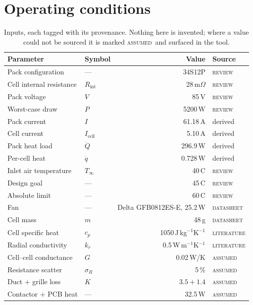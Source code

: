 \documentclass[11pt,a4paper]{article}
\newcommand{\qty}[2]{#1\,#2}
\newcommand{\REV}{\textcolor{ink}{\textsc{review}}}
\newcommand{\DAT}{\textcolor{ink}{\textsc{datasheet}}}
\newcommand{\LIT}{\textcolor{muted}{\textsc{literature}}}
\newcommand{\ASS}{\textcolor{warn}{\textsc{assumed}}}
\begin{document}
\section{Operating conditions}

\begin{table}[htbp]
\centering
\caption{Inputs, each tagged with its provenance. Nothing here is invented;
where a value could not be sourced it is marked \ASS\ and surfaced in the tool.}
\label{tab:inputs}
\small
{}
\begin{tabular}{llr l}
\toprule
\textbf{Parameter} & \textbf{Symbol} & \textbf{Value} & \textbf{Source} \\
\midrule
Pack configuration & --- & 34S12P & \REV \\
Cell internal resistance & $R_{\mathrm{int}}$ & \qty{28}{m$\Omega$} & \REV \\
Pack voltage & $V$ & \qty{85}{V} & \REV \\
Worst-case draw & $P$ & \qty{5200}{W} & \REV \\
Pack current & $I$ & \qty{61.18}{A} & derived \\
Cell current & $I_{\mathrm{cell}}$ & \qty{5.10}{A} & derived \\
Pack heat load & $\dot Q$ & \qty{296.9}{W} & derived \\
Per-cell heat & $\dot q$ & \qty{0.728}{W} & derived \\
Inlet air temperature & $T_\infty$ & \qty{40}{\textdegree C} & \REV \\
Design goal & --- & \qty{45}{\textdegree C} & \REV \\
Absolute limit & --- & \qty{60}{\textdegree C} & \REV \\
Fan & --- & Delta GFB0812ES-E, \qty{25.2}{W} & \DAT \\
Cell mass & $m$ & \qty{48}{g} & \DAT \\
Cell specific heat & $c_p$ & \qty{1050}{J\,kg$^{-1}$K$^{-1}$} & \LIT \\
Radial conductivity & $k_r$ & \qty{0.5}{W\,m$^{-1}$K$^{-1}$} & \LIT \\
Cell--cell conductance & $G$ & \qty{0.02}{W/K} & \ASS \\
Resistance scatter & $\sigma_R$ & \qty{5}{\%} & \ASS \\
Duct + grille loss & $K$ & $3.5 + 1.4$ & \ASS \\
Contactor + PCB heat & --- & \qty{32.5}{W} & \ASS \\
\bottomrule
\end{tabular}
\end{table}
\end{document}

